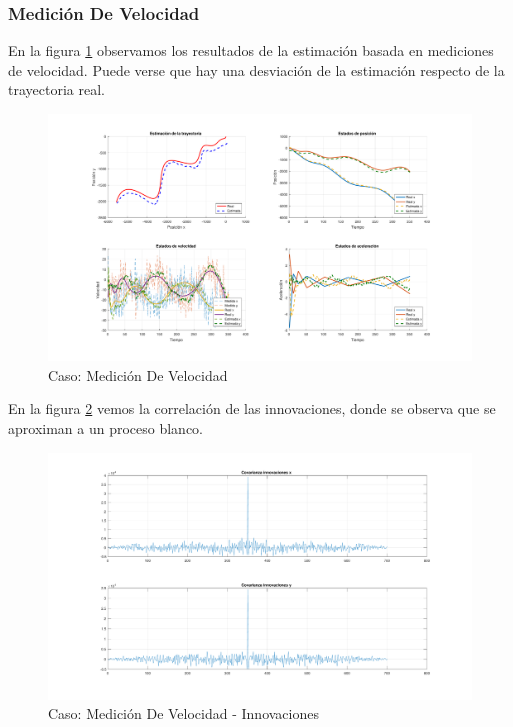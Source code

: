 		\subsubsection{Medición De Velocidad}
		
		En la figura \ref{fig:ej2b} observamos los resultados de la estimación basada en mediciones de velocidad. Puede verse que hay una desviación de la estimación respecto de la trayectoria real.
		
		\begin{figure}[H]
			\centering
			\includegraphics[scale=0.5,trim={6,5cm 0 0 0}]{Figuras/graf_ej2b.pdf}
			\caption{Caso: Medición De Velocidad}
			\label{fig:ej2b}
		\end{figure}
		
		En la figura \ref{fig:ej2b_innov} vemos la correlación de las innovaciones, donde se observa que se aproximan a un proceso blanco.
		
		\begin{figure}[H]
			\centering
			\includegraphics[width=1.0\textwidth,keepaspectratio]{Figuras/covinn_ej2b.pdf} \caption{Caso: Medición De Velocidad - Innovaciones} \label{fig:ej2b_innov}
		\end{figure}
			
